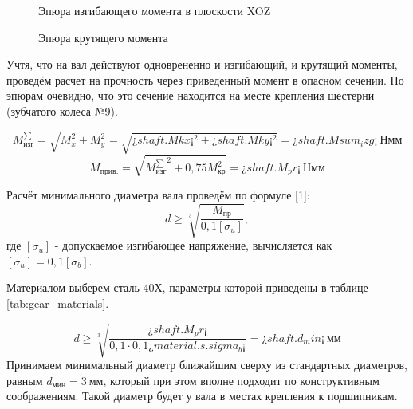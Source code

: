 \documentclass[14pt,a4paper,russian]{scrartcl}
\begin{document}
        \begin{figure}[h]
            \caption{Эпюра изгибающего момента в плоскости XOZ}
        \end{figure}
        \begin{figure}[h]
            \caption{Эпюра крутящего момента}
        \end{figure}

        Учтя, что на вал действуют одноврененно и изгибающий, и крутящий моменты,
        проведём расчет на прочность через приведенный момент в опасном сечении.
        По эпюрам очевидно, что это сечение находится на месте крепления шестерни
        (зубчатого колеса №9).

        \[ M^{\sum}_\text{изг} = \sqrt{M_x^2 + M_y^2} = \sqrt{¿shaft.Mkx¡^2 + ¿shaft.Mky¡^2} = ¿shaft.Msum_izg¡\ \text{Нмм}\]
        \[ M_\text{прив.} = \sqrt{{M^{\sum}_\text{изг}}^2 + 0,75M_\text{кр}^2} = ¿shaft.M_pr¡\ \text{Нмм}\]

        Расчёт минимального диаметра вала проведём по формуле [1]:
        \[ d\geq \sqrt[3]{\frac{M_\text{пр}}{0,1[\sigma_u]}}, \]
        где \( [\sigma_u] \) - допускаемое изгибающее напряжение, вычисляется как
         \( [\sigma_u] = 0,1[\sigma_b] \).\par
        Материалом выберем сталь 40Х, параметры которой приведены в таблице \ref{tab:gear_materials}.\par

        \[ d\geq \sqrt[3]{\frac{¿shaft.M_pr¡}{0,1\cdot 0,1 ¿material.s.sigma_b¡}} = ¿shaft.d_min¡\ \text{мм} \]
        Принимаем минимальный диаметр ближайшим сверху из стандартных диаметров, равным
        \( d_{\text{мин}} = 3\ \text{мм} \), который при этом вполне подходит по конструктивным
        соображениям. Такой диаметр будет у вала в местах крепления к подшипникам.
\end{document}
